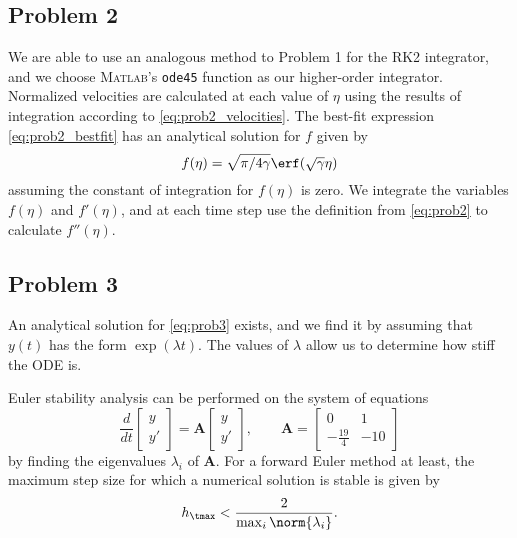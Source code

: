 \documentclass[12pt]{article}
\begin{document}
\subsection{Problem 2}

We are able to use an analogous method to Problem 1 for the RK2 integrator, and we choose \textsc{Matlab}'s \lstinline|ode45| function as our higher-order integrator. Normalized velocities are calculated at each value of $\eta$ using the results of integration according to \eqref{eq:prob2_velocities}. The best-fit expression \eqref{eq:prob2_bestfit} has an analytical solution for $f$ given by
\begin{equation}
f(\eta) = \sqrt{\pi / 4 \gamma} \erf(\sqrt{\gamma} \eta)
\end{equation}
assuming the constant of integration for $f(\eta)$ is zero. We integrate the variables $f(\eta)$ and $f'(\eta)$, and at each time step use the definition from \eqref{eq:prob2} to calculate $f''(\eta)$.

\subsection{Problem 3}

An analytical solution for \eqref{eq:prob3} exists, and we find it by assuming that $y(t)$ has the form $\exp(\lambda t)$. The values of $\lambda$ allow us to determine how stiff the ODE is.

Euler stability analysis can be performed on the system of equations
\begin{equation}
\frac{d}{dt}
\begin{bmatrix}
y \\
y'
\end{bmatrix}
=
\mathbf{A}
\begin{bmatrix}
y \\
y'
\end{bmatrix}
, \qquad
\mathbf{A}
=
\begin{bmatrix}
0 & 1 \\
-\frac{19}{4} & -10
\end{bmatrix}
\end{equation}
by finding the eigenvalues $\lambda_i$ of $\mathbf{A}$. For a forward Euler method at least, the maximum step size for which a numerical solution is stable is given by
\begin{equation}
h_\tmax < \frac{2}{\max_i\norm{\lambda_i}}
.
\end{equation}
\end{document}
